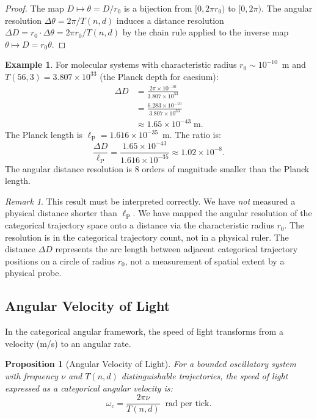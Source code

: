\documentclass[twocolumn,10pt,a4paper]{article}
\newtheorem{proposition}[theorem]{Proposition}
\theoremstyle{definition}
\newtheorem{example}[theorem]{Example}
\theoremstyle{remark}
\newtheorem{remark}[theorem]{Remark}
\newcommand{\lP}{\ell_{\mathrm{P}}}
\begin{document}
\begin{proof}
The map $D \mapsto \theta = D/r_0$ is a bijection from $[0, 2\pi r_0)$ to $[0, 2\pi)$. The angular resolution $\Delta\theta = 2\pi / T(n,d)$ induces a distance resolution $\Delta D = r_0 \cdot \Delta\theta = 2\pi r_0 / T(n,d)$ by the chain rule applied to the inverse map $\theta \mapsto D = r_0 \theta$.
\end{proof}

\begin{example}
For molecular systems with characteristic radius $r_0 \sim 10^{-10}$~m and $T(56,3) = 3.807 \times 10^{33}$ (the Planck depth for caesium):
\begin{align}
\Delta D &= \frac{2\pi \times 10^{-10}}{3.807 \times 10^{33}} \nonumber \\
         &= \frac{6.283 \times 10^{-10}}{3.807 \times 10^{33}} \nonumber \\
         &\approx 1.65 \times 10^{-43}\;\text{m}.
\end{align}
The Planck length is $\lP = 1.616 \times 10^{-35}$~m. The ratio is:
\begin{equation}
\frac{\Delta D}{\lP} = \frac{1.65 \times 10^{-43}}{1.616 \times 10^{-35}} \approx 1.02 \times 10^{-8}.
\end{equation}
The angular distance resolution is 8 orders of magnitude smaller than the Planck length.
\end{example}

\begin{remark}
This result must be interpreted correctly. We have \emph{not} measured a physical distance shorter than $\lP$. We have mapped the angular resolution of the categorical trajectory space onto a distance via the characteristic radius $r_0$. The resolution is in the categorical trajectory count, not in a physical ruler. The distance $\Delta D$ represents the arc length between adjacent categorical trajectory positions on a circle of radius $r_0$, not a measurement of spatial extent by a physical probe.
\end{remark}

\subsection{Angular Velocity of Light}

In the categorical angular framework, the speed of light transforms from a velocity (m/s) to an angular rate.

\begin{proposition}[Angular Velocity of Light]
\label{prop:c_angular}
For a bounded oscillatory system with frequency $\nu$ and $T(n,d)$ distinguishable trajectories, the speed of light expressed as a categorical angular velocity is:
\begin{equation}
\omega_c = \frac{2\pi\nu}{T(n,d)} \;\;\text{rad per tick}.
\end{equation}
\end{proposition}
\end{document}
